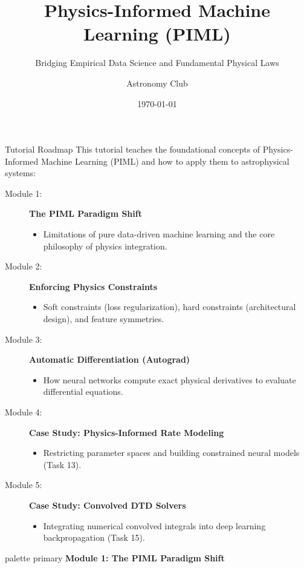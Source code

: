 \documentclass[9pt]{beamer}
\title{Physics-Informed Machine Learning (PIML)}
\subtitle{Bridging Empirical Data Science and Fundamental Physical Laws}
\author{Astronomy Club}
\date{\today}
\begin{document}
\maketitle

\begin{frame}{Tutorial Roadmap}
  This tutorial teaches the foundational concepts of Physics-Informed Machine Learning (PIML) and how to apply them to astrophysical systems:
  \begin{description}
    \item[Module 1:] \textbf{The PIML Paradigm Shift}
      \begin{itemize}
        \item Limitations of pure data-driven machine learning and the core philosophy of physics integration.
      \end{itemize}
    \item[Module 2:] \textbf{Enforcing Physics Constraints}
      \begin{itemize}
        \item Soft constraints (loss regularization), hard constraints (architectural design), and feature symmetries.
      \end{itemize}
    \item[Module 3:] \textbf{Automatic Differentiation (Autograd)}
      \begin{itemize}
        \item How neural networks compute exact physical derivatives to evaluate differential equations.
      \end{itemize}
    \item[Module 4:] \textbf{Case Study: Physics-Informed Rate Modeling}
      \begin{itemize}
        \item Restricting parameter spaces and building constrained neural models (Task 13).
      \end{itemize}
    \item[Module 5:] \textbf{Case Study: Convolved DTD Solvers}
      \begin{itemize}
        \item Integrating numerical convolved integrals into deep learning backpropagation (Task 15).
      \end{itemize}
  \end{description}
\end{frame}

\begin{frame}[plain]
  \vfill
  \centering
  \begin{beamercolorbox}[sep=8pt,center,shadow=true,rounded=true]{palette primary}
    \textbf{Module 1: The PIML Paradigm Shift}
  \end{beamercolorbox}
  \vfill
\end{frame}
\end{document}

